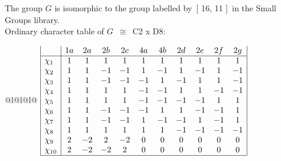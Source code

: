 \documentclass[varwidth=\maxdimen,border=10]{standalone}
\begin{document}
The group $G$ is isomorphic to the group labelled by\ [ 16, 11 ]\ in the Small Groups library.\\
Ordinary character table of $G$\ $\cong$\ C2 x D8:\\
\begin{center}
\begin{tabular}{@{}l@{}l@{}l@{}}
\hline
\(\begin{array}{|l|cccccccccc|}
  & 1a & 2a & 2b & 2c & 4a & 4b & 2d & 2e & 2f & 2g\\ \hline
\chi_{1} & 1 & 1 & 1 & 1 & 1 & 1 & 1 & 1 & 1 & 1\\
\chi_{2} & 1 & 1 & -1 & -1 & 1 & -1 & 1 & -1 & 1 & -1\\
\chi_{3} & 1 & 1 & -1 & -1 & -1 & 1 & -1 & 1 & 1 & -1\\
\chi_{4} & 1 & 1 & 1 & 1 & -1 & -1 & 1 & 1 & -1 & -1\\
\chi_{5} & 1 & 1 & 1 & 1 & -1 & -1 & -1 & -1 & 1 & 1\\
\chi_{6} & 1 & 1 & -1 & -1 & -1 & 1 & 1 & -1 & -1 & 1\\
\chi_{7} & 1 & 1 & -1 & -1 & 1 & -1 & -1 & 1 & -1 & 1\\
\chi_{8} & 1 & 1 & 1 & 1 & 1 & 1 & -1 & -1 & -1 & -1\\
\chi_{9} & 2 & -2 & 2 & -2 & 0 & 0 & 0 & 0 & 0 & 0\\
\chi_{10} & 2 & -2 & -2 & 2 & 0 & 0 & 0 & 0 & 0 & 0\\
\hline
\end{array}\)\\
\end{tabular}
\end{center}
\end{document}
